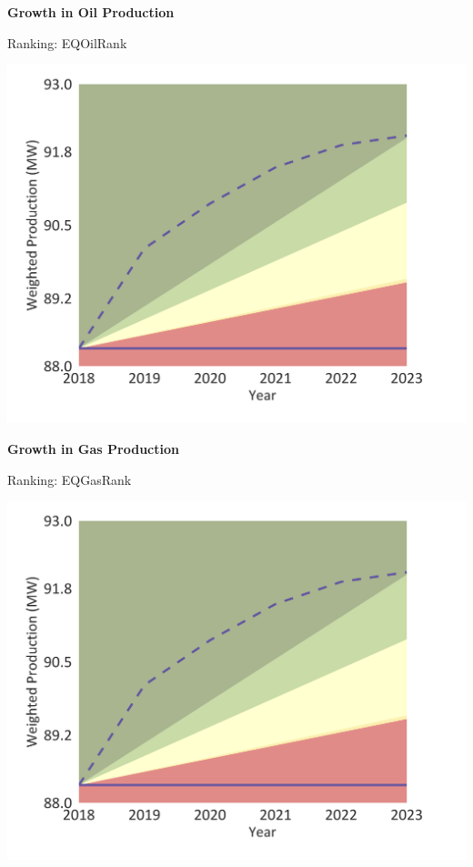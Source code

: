 \documentclass[10pt,twoside,table]{article}\usepackage[]{graphicx}\usepackage[]{color}
\begin{document}
	\begin{minipage}[t]{.49\linewidth}
		\textbf{Growth in Oil Production }
		
		Ranking: EQOilRank
		
		\includegraphics[trim = {0 0cm 0 0},width=1\linewidth]{CAFigures/Fig10}
		
	\end{minipage}	
	\hspace{.02\linewidth}
	\begin{minipage}[t]{.49\textwidth}
		\textbf{Growth in Gas Production }
		
		Ranking: EQGasRank
		
		\includegraphics[trim = {0 0cm 0 0},width=1\linewidth]{CAFigures/Fig10}

	\end{minipage}
\end{document}
